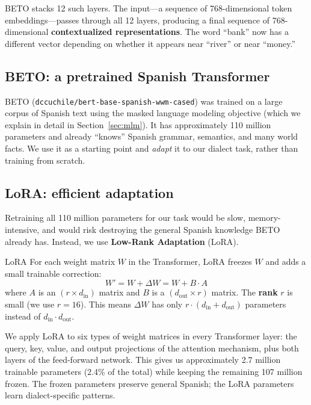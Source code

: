 \documentclass[11pt,a4paper]{article}
\theoremstyle{definition}
\begin{document}
BETO stacks 12 such layers. The input---a sequence of 768-dimensional
token embeddings---passes through all 12 layers, producing a final
sequence of 768-dimensional \textbf{contextualized representations}.
The word ``bank'' now has a different vector depending on whether it
appears near ``river'' or near ``money.''

\subsection{BETO: a pretrained Spanish Transformer}

BETO (\texttt{dccuchile/bert-base-spanish-wwm-cased}) was trained on
a large corpus of Spanish text using the masked language modeling
objective (which we explain in detail in Section~\ref{sec:mlm}). It
has approximately 110 million parameters and already ``knows''
Spanish grammar, semantics, and many world facts. We use it as a
starting point and \emph{adapt} it to our dialect task, rather than
training from scratch.

\subsection{LoRA: efficient adaptation}

Retraining all 110 million parameters for our task would be slow,
memory-intensive, and would risk destroying the general Spanish
knowledge BETO already has. Instead, we use
\textbf{Low-Rank Adaptation} (LoRA).

\begin{keyidea}{LoRA}
For each weight matrix $W$ in the Transformer, LoRA freezes $W$ and
adds a small trainable correction:
\[
W' = W + \Delta W = W + B \cdot A
\]
where $A$ is an $(r \times d_{\text{in}})$ matrix and $B$ is a
$(d_{\text{out}} \times r)$ matrix. The \textbf{rank} $r$ is small
(we use $r=16$). This means $\Delta W$ has only
$r \cdot (d_{\text{in}} + d_{\text{out}})$ parameters instead of
$d_{\text{in}} \cdot d_{\text{out}}$.
\end{keyidea}

We apply LoRA to six types of weight matrices in every Transformer
layer: the query, key, value, and output projections of the attention
mechanism, plus both layers of the feed-forward network. This gives us
approximately 2.7 million trainable parameters (2.4\% of the total)
while keeping the remaining 107 million frozen. The frozen parameters
preserve general Spanish; the LoRA parameters learn dialect-specific
patterns.
\end{document}
